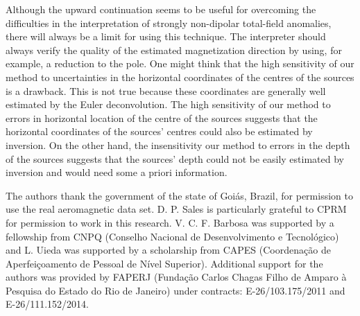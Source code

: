 \documentclass[journal abbreviation, npg]{copernicus}
\begin{document}
Although the upward continuation seems to be useful for overcoming the difficulties in the interpretation of strongly non-dipolar total-field anomalies, there will always be a limit for using this technique. The interpreter should always verify the quality of the estimated magnetization direction by using, for example, a reduction to the pole. One might think that the high sensitivity of our method to uncertainties in the horizontal coordinates of the centres of the sources is a drawback. This is not true because these coordinates are generally well estimated by the Euler deconvolution. The high sensitivity of our method to errors in horizontal location of the centre of the sources suggests that  the horizontal coordinates of the sources’ centres could also be estimated by inversion. On the other hand, the insensitivity our method to errors in the depth of the sources suggests that the sources' depth could not be easily estimated by inversion and would need some a priori information.



\begin{acknowledgements}
The authors thank the government of the state of Goiás, Brazil, for permission to use the real aeromagnetic data set. D. P. Sales is particularly grateful to CPRM for permission to work in this research.  V. C. F. Barbosa was supported by a fellowship from CNPQ (Conselho Nacional de Desenvolvimento e Tecnológico) and L. Uieda was supported by a scholarship from CAPES (Coordenação de Aperfeiçoamento de Pessoal de Nível Superior). Additional support for the authors was provided by FAPERJ (Fundação Carlos Chagas Filho de Amparo à Pesquisa do Estado do Rio de Janeiro) under contracts:  E-26/103.175/2011 and E-26/111.152/2014.
\end{acknowledgements}

\end{document}
